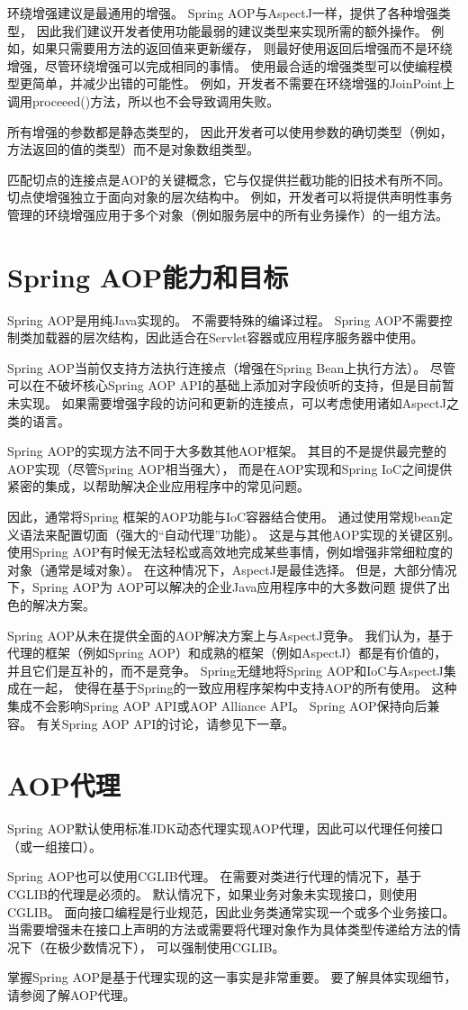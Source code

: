 环绕增强建议是最通用的增强。
Spring AOP与AspectJ一样，提供了各种增强类型，
因此我们建议开发者使用功能最弱的建议类型来实现所需的额外操作。
例如，如果只需要用方法的返回值来更新缓存，
则最好使用返回后增强而不是环绕增强，尽管环绕增强可以完成相同的事情。
使用最合适的增强类型可以使编程模型更简单，并减少出错的可能性。
例如，开发者不需要在环绕增强的JoinPoint上调用proceeed()方法，所以也不会导致调用失败。

所有增强的参数都是静态类型的，
因此开发者可以使用参数的确切类型（例如，方法返回的值的类型）而不是对象数组类型。

匹配切点的连接点是AOP的关键概念，它与仅提供拦截功能的旧技术有所不同。
切点使增强独立于面向对象的层次结构中。
例如，开发者可以将提供声明性事务管理的环绕增强应用于多个对象（例如服务层中的所有业务操作）的一组方法。

\section{Spring AOP能力和目标}
Spring AOP是用纯Java实现的。 不需要特殊的编译过程。 
Spring AOP不需要控制类加载器的层次结构，因此适合在Servlet容器或应用程序服务器中使用。

Spring AOP当前仅支持方法执行连接点（增强在Spring Bean上执行方法）。
尽管可以在不破坏核心Spring AOP API的基础上添加对字段侦听的支持，但是目前暂未实现。
如果需要增强字段的访问和更新的连接点，可以考虑使用诸如AspectJ之类的语言。

Spring AOP的实现方法不同于大多数其他AOP框架。 
其目的不是提供最完整的AOP实现（尽管Spring AOP相当强大），
而是在AOP实现和Spring IoC之间提供紧密的集成，以帮助解决企业应用程序中的常见问题。

因此，通常将Spring 框架的AOP功能与IoC容器结合使用。
通过使用常规bean定义语法来配置切面（强大的“自动代理”功能）。
这是与其他AOP实现的关键区别。
使用Spring AOP有时候无法轻松或高效地完成某些事情，例如增强非常细粒度的对象（通常是域对象）。
在这种情况下，AspectJ是最佳选择。
但是，大部分情况下，Spring AOP为
AOP可以解决的企业Java应用程序中的大多数问题
提供了出色的解决方案。

Spring AOP从未在提供全面的AOP解决方案上与AspectJ竞争。
 我们认为，基于代理的框架（例如Spring AOP）和成熟的框架（例如AspectJ）都是有价值的，
 并且它们是互补的，而不是竞争。 
 Spring无缝地将Spring AOP和IoC与AspectJ集成在一起，
 使得在基于Spring的一致应用程序架构中支持AOP的所有使用。
  这种集成不会影响Spring AOP API或AOP Alliance API。
   Spring AOP保持向后兼容。 有关Spring AOP API的讨论，请参见下一章。

\section{AOP代理}
Spring AOP默认使用标准JDK动态代理实现AOP代理，因此可以代理任何接口（或一组接口）。

Spring AOP也可以使用CGLIB代理。 
在需要对类进行代理的情况下，基于CGLIB的代理是必须的。 
默认情况下，如果业务对象未实现接口，则使用CGLIB。 
面向接口编程是行业规范，因此业务类通常实现一个或多个业务接口。 
当需要增强未在接口上声明的方法或需要将代理对象作为具体类型传递给方法的情况下（在极少数情况下），
可以强制使用CGLIB。

掌握Spring AOP是基于代理实现的这一事实是非常重要。 
要了解具体实现细节，请参阅了解AOP代理。
